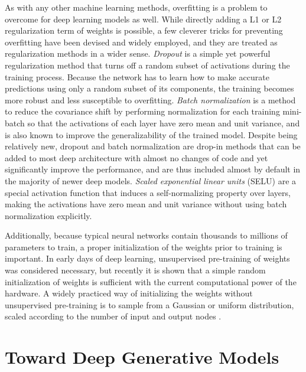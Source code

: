 As with any other machine learning methods, overfitting is a problem to overcome for deep learning models as well.
While directly adding a L1 or L2 regularization term of weights is possible, a few cleverer tricks for preventing overfitting have been devised and widely employed, and they are treated as regularization methods in a wider sense.
\emph{Dropout} \cite{srivastava2014dropout} is a simple yet powerful regularization method that turns off a random subset of activations during the training process.
Because the network has to learn how to make accurate predictions using only a random subset of its components, the training becomes more robust and less susceptible to overfitting.
\emph{Batch normalization} \cite{ioffe2015batchnorm} is a method to reduce the covariance shift by performing normalization for each training mini-batch so that the activations of each layer have zero mean and unit variance, and is also known to improve the generalizability of the trained model.
Despite being relatively new, dropout and batch normalization are drop-in methods that can be added to most deep architecture with almost no changes of code and yet significantly improve the performance, and are thus included almost by default in the majority of newer deep models.
\emph{Scaled exponential linear units} (SELU) \cite{klambauer2017selu} are a special activation function that induces a self-normalizing property over layers, making the activations have zero mean and unit variance without using batch normalization explicitly.


Additionally, because typical neural networks contain thousands to millions of parameters to train, a proper initialization of the weights prior to training is important.
In early days of deep learning, unsupervised pre-training of weights \cite{bengio2007greedy,erhan2010pretraining} was considered necessary, but recently it is shown that a simple random initialization of weights is sufficient with the current computational power of the hardware.
A widely practiced way of initializing the weights without unsupervised pre-training is to sample from a Gaussian or uniform distribution, scaled according to the number of input and output nodes \cite{glorot2010initialization,he2015prelu}.


\section{Toward Deep Generative Models}

